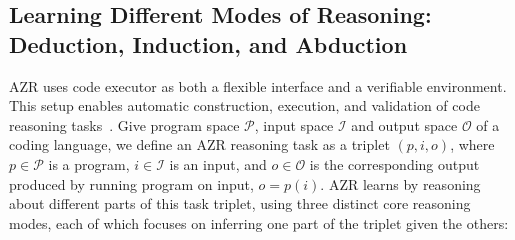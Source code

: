 \documentclass{article}
\begin{document}
\subsection{Learning Different Modes of Reasoning: Deduction, Induction, and Abduction}
\label{sec:task_type}
AZR uses code executor as both a flexible interface and a verifiable environment. This setup enables automatic construction, execution, and validation of code reasoning tasks~\citep{stuart2013understanding, aryabumi2024code}. Give program space \(\mathscr{P}\), input space \(\mathscr{I}\) and output space \(\mathscr{O}\) of a coding language, we define an AZR reasoning task as a triplet \((p, i, o)\), where \(p \in \mathscr{P}\) is a program, \(i \in \mathscr{I}\) is an input, and \(o \in \mathscr{O}\) is the corresponding output produced by running program on input, \(o=p(i)\). AZR learns by reasoning about different parts of this task triplet, using three distinct core reasoning modes, each of which focuses on inferring one part of the triplet given the others:
\end{document}
